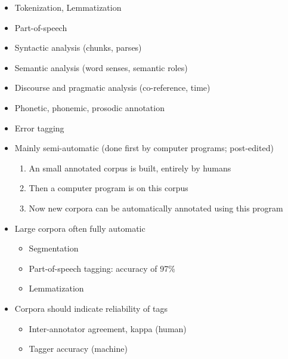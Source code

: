 \documentclass[a4paper,landscape,headrule,footrule,xetex]{foils}
\begin{document}
\begin{itemize}
\item  Tokenization, Lemmatization
\item  Part-of-speech
\item  Syntactic analysis (chunks, parses)
\item  Semantic analysis  (word senses, semantic roles)
\item  Discourse and pragmatic analysis (co-reference, time)
\item  Phonetic, phonemic, prosodic annotation
\item  Error tagging
\end{itemize}

\begin{itemize}
\item Mainly semi-automatic (done first by computer programs; post-edited)
 \begin{enumerate}
  \item An small annotated corpus is built, entirely by humans
  \item Then a computer program is  on this corpus
  \item Now new corpora can be automatically annotated using this program
  \end{enumerate}
\item Large corpora often fully automatic
  \begin{itemize}
  \item Segmentation
  \item Part-of-speech tagging: accuracy of 97\%
  \item Lemmatization
  \end{itemize}
\item Corpora should indicate reliability of tags
  \begin{itemize}
  \item Inter-annotator agreement, kappa (human)
  \item Tagger accuracy (machine)
  \end{itemize}
  
\end{itemize}


\end{document}
